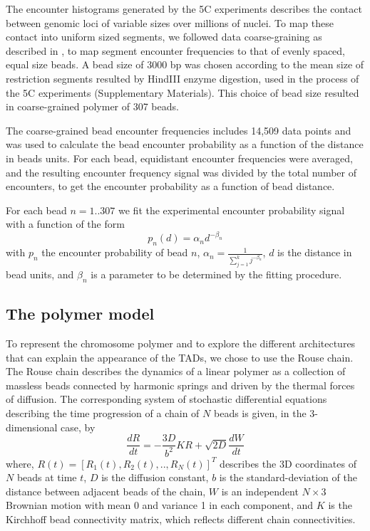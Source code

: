 \documentclass[12pt]{article}
\begin{document}
The encounter histograms generated by the 5C experiments describes the contact between genomic loci of variable sizes over millions of nuclei. To map these contact into uniform sized segments, we followed data coarse-graining as described in \cite{Giorgetti2014}, to map segment encounter frequencies to that of evenly spaced, equal size beads. A bead size of 3000 bp was chosen according to the mean size of restriction segments resulted by HindIII enzyme digestion, used in the process of the 5C experiments \cite{Nora2012} \cite{Giorgetti2014} (Supplementary Materials). This choice of bead size resulted in coarse-grained polymer of 307 beads.

The coarse-grained bead encounter frequencies includes 14,509 data points and was used to calculate the bead encounter probability as a function of the distance in beads units. For each bead, equidistant encounter frequencies were averaged, and the resulting encounter frequency signal was divided by the total number of encounters, to get the encounter probability as a function of bead distance.

For each bead $n=1..307$ we fit the experimental encounter probability signal with a function of the form 
\begin{equation}\label{equation_encounterProbabilityModel}
p_n(d)=\alpha_n d^{-\beta_n}
\end{equation}
with $p_n$ the encounter probability of bead $n$, $\alpha_n = \frac{1}{\sum_{j=1}^k j^{-\beta_n}}$, $d$ is the distance in bead units, and $\beta_n$ is a parameter to be determined by the fitting procedure.


\subsection{The polymer model}\label{subsection_thePolymerModel}
To represent the chromosome polymer and to explore the different architectures that can explain the appearance of the TADs, we chose to use the Rouse chain. The Rouse chain describes the dynamics of a linear polymer as a collection of massless beads connected by harmonic springs and driven by the thermal forces of diffusion. The corresponding system of stochastic differential equations describing the time progression of a chain of $N$ beads is given, in the 3-dimensional case, by
\begin{equation}
\frac{dR}{dt}=-\frac{3D}{b^2}KR +\sqrt{2D}\frac{dW}{dt}
\end{equation}
where, $R(t)=[R_1(t),R_2(t),..,R_N(t)]^T$ describes the 3D coordinates of $N$ beads at time $t$, $D$ is the diffusion constant, $b$ is the standard-deviation of the distance between adjacent beads of the chain, $W$ is an independent $N\times3$ Brownian motion with mean 0 and variance 1 in each component, and $K$ is the Kirchhoff bead connectivity matrix, which reflects different chain connectivities.
\end{document}
